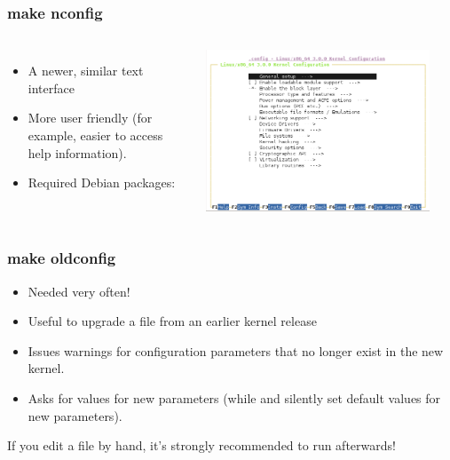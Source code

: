 \begin{frame}
  \frametitle{make nconfig}
  \begin{columns}
    \begin{itemize}
      \item A newer, similar text interface
      \item More user friendly (for example, easier to access help information).
      \item Required Debian packages: 
    \end{itemize}
    \includegraphics[width=0.9\textwidth]{slides/sysdev-kernel-building/nconfig-screenshot.png}
  \end{columns}
\end{frame}

\begin{frame}
  \frametitle{make oldconfig}
  \begin{itemize}
  \item Needed very often!
  \item Useful to upgrade a  file from an earlier kernel release
  \item Issues warnings for configuration parameters that no longer
    exist in the new kernel.
  \item Asks for values for new parameters (while 
    and  silently set default values for new
    parameters).
  \end{itemize}
  If you edit a  file by hand, it's strongly recommended
  to run  afterwards!
\end{frame}

